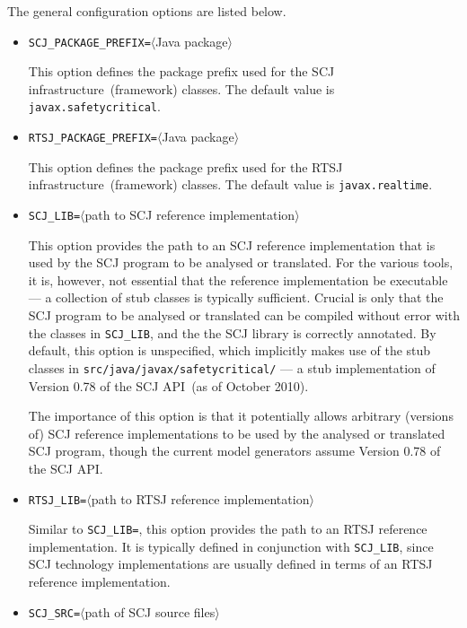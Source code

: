 \documentclass{report}
\begin{document}
The general configuration options are listed below.
%
\begin{itemize}
  \item \verb"SCJ_PACKAGE_PREFIX="$\langle$Java package$\rangle$

  This option defines the package prefix used for the SCJ infrastructure~(framework) classes. The default value is \verb"javax.safetycritical".

  \item \verb"RTSJ_PACKAGE_PREFIX="$\langle$Java package$\rangle$

  This option defines the package prefix used for the RTSJ infrastructure~(framework) classes. The default value is \verb"javax.realtime".

  \item \verb"SCJ_LIB="$\langle$path to SCJ reference implementation$\rangle$

  This option provides the path to an SCJ reference implementation that is used by the SCJ program to be analysed or translated. For the various tools, it is, however, not essential that the reference implementation be executable --- a collection of stub classes is typically sufficient. Crucial is only that the SCJ program to be analysed or translated can be compiled without error with the classes in \verb"SCJ_LIB", and the the SCJ library is correctly annotated. By default, this option is unspecified, which implicitly makes use of the stub classes in \verb"src/java/javax/safetycritical/" --- a stub implementation of Version 0.78 of the SCJ API~(as of October 2010).
  
  The importance of this option is that it potentially allows arbitrary (versions of) SCJ reference implementations to be used by the analysed or translated SCJ program, though the current model generators assume Version 0.78 of the SCJ API.
  

  \item \verb"RTSJ_LIB="$\langle$path to RTSJ reference implementation$\rangle$

  Similar to \verb"SCJ_LIB=", this option provides the path to an RTSJ reference implementation. It is typically defined in conjunction with \verb"SCJ_LIB", since SCJ technology implementations are usually defined in terms of an RTSJ reference implementation.

  \item \verb"SCJ_SRC="$\langle$path of SCJ source files$\rangle$


\end{itemize}
\end{document}
